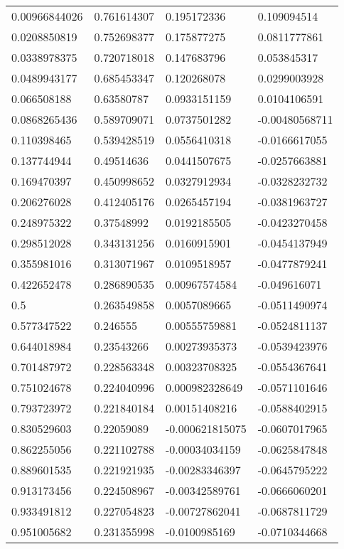 \begin{longtable}{llll}
	0.00966844026 & 0.761614307 & 0.195172336 & 0.109094514 \\ 
	0.0208850819 & 0.752698377 & 0.175877275 & 0.0811777861 \\ 
	0.0338978375 & 0.720718018 & 0.147683796 & 0.053845317 \\ 
	0.0489943177 & 0.685453347 & 0.120268078 & 0.0299003928 \\ 
	0.066508188 & 0.63580787 & 0.0933151159 & 0.0104106591 \\ 
	0.0868265436 & 0.589709071 & 0.0737501282 & -0.00480568711 \\ 
	0.110398465 & 0.539428519 & 0.0556410318 & -0.0166617055 \\ 
	0.137744944 & 0.49514636 & 0.0441507675 & -0.0257663881 \\ 
	0.169470397 & 0.450998652 & 0.0327912934 & -0.0328232732 \\ 
	0.206276028 & 0.412405176 & 0.0265457194 & -0.0381963727 \\ 
	0.248975322 & 0.37548992 & 0.0192185505 & -0.0423270458 \\ 
	0.298512028 & 0.343131256 & 0.0160915901 & -0.0454137949 \\ 
	0.355981016 & 0.313071967 & 0.0109518957 & -0.0477879241 \\ 
	0.422652478 & 0.286890535 & 0.00967574584 & -0.049616071 \\ 
	0.5 & 0.263549858 & 0.0057089665 & -0.0511490974 \\ 
	0.577347522 & 0.246555 & 0.00555759881 & -0.0524811137 \\ 
	0.644018984 & 0.23543266 & 0.00273935373 & -0.0539423976 \\ 
	0.701487972 & 0.228563348 & 0.00323708325 & -0.0554367641 \\ 
	0.751024678 & 0.224040996 & 0.000982328649 & -0.0571101646 \\ 
	0.793723972 & 0.221840184 & 0.00151408216 & -0.0588402915 \\ 
	0.830529603 & 0.22059089 & -0.000621815075 & -0.0607017965 \\ 
	0.862255056 & 0.221102788 & -0.00034034159 & -0.0625847848 \\ 
	0.889601535 & 0.221921935 & -0.00283346397 & -0.0645795222 \\ 
	0.913173456 & 0.224508967 & -0.00342589761 & -0.0666060201 \\ 
	0.933491812 & 0.227054823 & -0.00727862041 & -0.0687811729 \\ 
	0.951005682 & 0.231355998 & -0.0100985169 & -0.0710344668 \\ 

\end{longtable}
